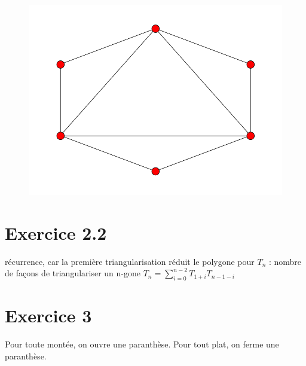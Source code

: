 \documentclass[fontsize=10pt]{article}
\begin{document}
\begin{figure}[hbtp]
\centering
\includegraphics[scale=0.5]{imgs/hexagon/hexagon_14.png}
\end{figure}

\clearpage

\section*{Exercice 2.2}

récurrence, car la première triangularisation réduit le polygone \newline 
pour $T_n$ : nombre de façons de triangulariser un n-gone \newline
\newline
$T_n = \sum^{n-2}_{i=0} T_{1+i} T_{n-1-i}$

\section*{Exercice 3}
Pour toute montée, on ouvre une paranthèse. \newline
Pour tout plat, on ferme une paranthèse.
\end{document}
